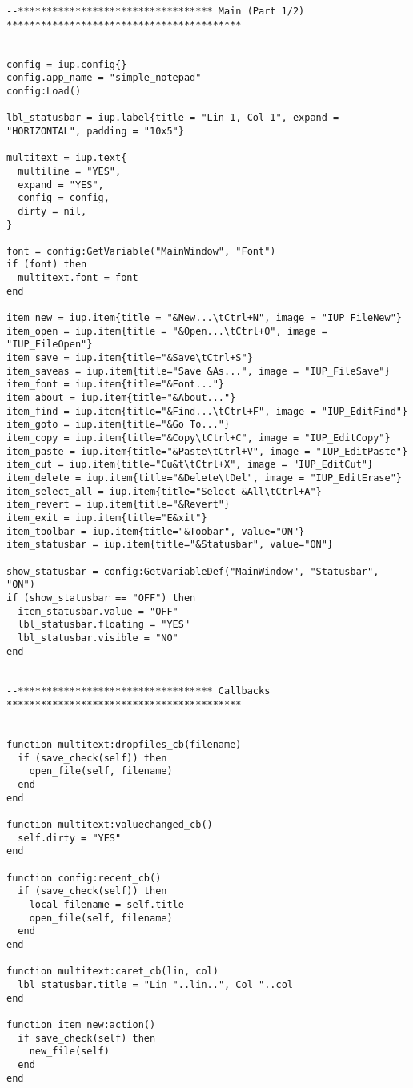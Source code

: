 \documentclass{ctexart}
\begin{document}
\begin{lstlisting}
--********************************** Main (Part 1/2) *****************************************


config = iup.config{}
config.app_name = "simple_notepad"
config:Load()

lbl_statusbar = iup.label{title = "Lin 1, Col 1", expand = "HORIZONTAL", padding = "10x5"}

multitext = iup.text{
  multiline = "YES",
  expand = "YES",
  config = config,
  dirty = nil,
}
 
font = config:GetVariable("MainWindow", "Font")
if (font) then
  multitext.font = font
end

item_new = iup.item{title = "&New...\tCtrl+N", image = "IUP_FileNew"}
item_open = iup.item{title = "&Open...\tCtrl+O", image = "IUP_FileOpen"}
item_save = iup.item{title="&Save\tCtrl+S"}
item_saveas = iup.item{title="Save &As...", image = "IUP_FileSave"}
item_font = iup.item{title="&Font..."}
item_about = iup.item{title="&About..."}
item_find = iup.item{title="&Find...\tCtrl+F", image = "IUP_EditFind"}
item_goto = iup.item{title="&Go To..."}
item_copy = iup.item{title="&Copy\tCtrl+C", image = "IUP_EditCopy"}
item_paste = iup.item{title="&Paste\tCtrl+V", image = "IUP_EditPaste"}
item_cut = iup.item{title="Cu&t\tCtrl+X", image = "IUP_EditCut"}
item_delete = iup.item{title="&Delete\tDel", image = "IUP_EditErase"}
item_select_all = iup.item{title="Select &All\tCtrl+A"}
item_revert = iup.item{title="&Revert"}
item_exit = iup.item{title="E&xit"}
item_toolbar = iup.item{title="&Toobar", value="ON"}
item_statusbar = iup.item{title="&Statusbar", value="ON"}

show_statusbar = config:GetVariableDef("MainWindow", "Statusbar", "ON")
if (show_statusbar == "OFF") then
  item_statusbar.value = "OFF"
  lbl_statusbar.floating = "YES"
  lbl_statusbar.visible = "NO"
end


--********************************** Callbacks *****************************************


function multitext:dropfiles_cb(filename)
  if (save_check(self)) then
    open_file(self, filename)
  end
end

function multitext:valuechanged_cb()
  self.dirty = "YES"
end

function config:recent_cb()
  if (save_check(self)) then
    local filename = self.title
    open_file(self, filename)
  end
end

function multitext:caret_cb(lin, col)
  lbl_statusbar.title = "Lin "..lin..", Col "..col
end

function item_new:action()
  if save_check(self) then
    new_file(self)
  end
end


\end{lstlisting}
\end{document}
